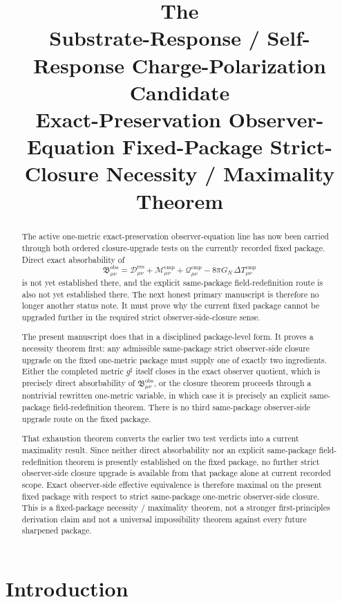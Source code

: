 \documentclass[11pt]{article}
\title{\textbf{The \TheoryName{}}\\[0.4em]
\large Substrate-Response / Self-Response Charge-Polarization Candidate\\
\large Exact-Preservation Observer-Equation Fixed-Package Strict-Closure Necessity / Maximality Theorem}
\author{}
\date{}
\newcommand{\CompletedMetric}{g^{\sharp}}
\newcommand{\ResidualDec}{\mathcal D_{\mu\nu}^{\mathrm{res}}}
\newcommand{\CompMix}{\mathcal M_{\mu\nu}^{\mathrm{cmp}}}
\newcommand{\CompQuad}{\mathcal Q_{\mu\nu}^{\mathrm{cmp}}}
\newcommand{\DeltaTComp}{\Delta T_{\mu\nu}^{\mathrm{cmp}}}
\newcommand{\ObsBurden}{\mathfrak B_{\mu\nu}^{\mathrm{obs}}}
\begin{document}
\maketitle

\begin{abstract}
The active one-metric exact-preservation observer-equation line has now been carried through both ordered closure-upgrade tests on the currently recorded fixed package. Direct exact absorbability of
\[
\ObsBurden
=
\ResidualDec+\CompMix+\CompQuad-8\pi G_N\,\DeltaTComp
\]
is not yet established there, and the explicit same-package field-redefinition route is also not yet established there. The next honest primary manuscript is therefore no longer another status note. It must prove why the current fixed package cannot be upgraded further in the required strict observer-side-closure sense.

The present manuscript does that in a disciplined package-level form. It proves a necessity theorem first: any admissible same-package strict observer-side closure upgrade on the fixed one-metric package must supply one of exactly two ingredients. Either the completed metric \(\CompletedMetric\) itself closes in the exact observer quotient, which is precisely direct absorbability of \(\ObsBurden\), or the closure theorem proceeds through a nontrivial rewritten one-metric variable, in which case it is precisely an explicit same-package field-redefinition theorem. There is no third same-package observer-side upgrade route on the fixed package.

That exhaustion theorem converts the earlier two test verdicts into a current maximality result. Since neither direct absorbability nor an explicit same-package field-redefinition theorem is presently established on the fixed package, no further strict observer-side closure upgrade is available from that package alone at current recorded scope. Exact observer-side effective equivalence is therefore maximal on the present fixed package with respect to strict same-package one-metric observer-side closure. This is a fixed-package necessity / maximality theorem, not a stronger first-principles derivation claim and not a universal impossibility theorem against every future sharpened package.
\end{abstract}

\section{Introduction}
\end{document}
